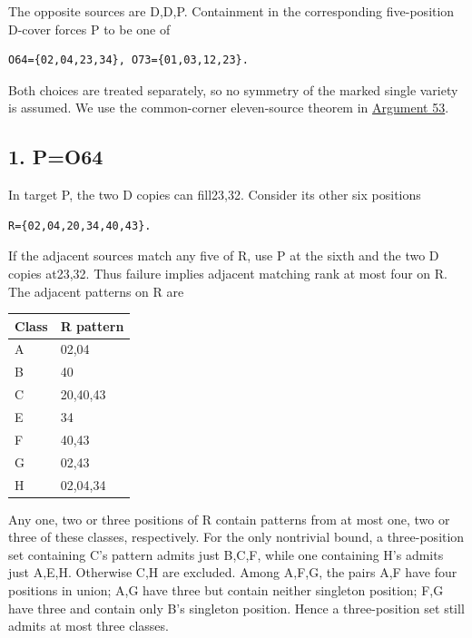 \documentclass[
  10pt,
]{article}
\begin{document}
The opposite sources are D,D,P. Containment in the corresponding
five-position D-cover forces P to be one of

\begin{verbatim}
O64={02,04,23,34}, O73={01,03,12,23}.
\end{verbatim}

Both choices are treated separately, so no symmetry of the marked single
variety is assumed. We use the common-corner eleven-source theorem in
\protect\hyperlink{arg-53}{Argument 53}.

\hypertarget{po64}{%
\subsection*{1. P=O64}\label{po64}}

In target P, the two D copies can fill23,32. Consider its other six
positions

\begin{verbatim}
R={02,04,20,34,40,43}.
\end{verbatim}

If the adjacent sources match any five of R, use P at the sixth and the
two D copies at23,32. Thus failure implies adjacent matching rank at
most four on R. The adjacent patterns on R are

\begin{longtable}[]{@{}ll@{}}
\toprule\noalign{}
Class & R pattern \\
\midrule\noalign{}
\endhead
\bottomrule\noalign{}
\endlastfoot
A & 02,04 \\
B & 40 \\
C & 20,40,43 \\
E & 34 \\
F & 40,43 \\
G & 02,43 \\
H & 02,04,34 \\
\end{longtable}

Any one, two or three positions of R contain patterns from at most one,
two or three of these classes, respectively. For the only nontrivial
bound, a three-position set containing C's pattern admits just B,C,F,
while one containing H's admits just A,E,H. Otherwise C,H are excluded.
Among A,F,G, the pairs A,F have four positions in union; A,G have three
but contain neither singleton position; F,G have three and contain only
B's singleton position. Hence a three-position set still admits at most
three classes.
\end{document}
